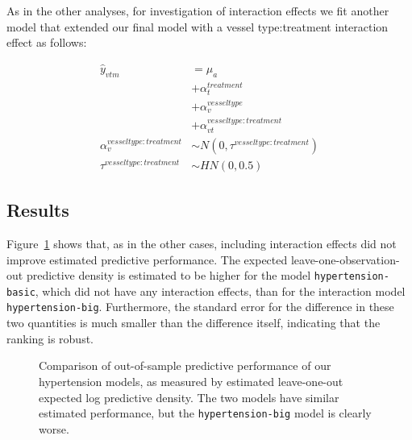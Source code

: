 \documentclass[
  letterpaper,
  DIV=11,
  numbers=noendperiod,
  oneside]{scrartcl}
\theoremstyle{plain}
\theoremstyle{remark}
\begin{document}
As in the other analyses, for investigation of interaction effects we
fit another model that extended our final model with a vessel
type:treatment interaction effect as follows:

\begin{align}
\hat{y}_{vtm} &= \mu_a \nonumber \\
  &+ \alpha^{treatment}_{t} \nonumber \\
  &+ \alpha^{vesseltype}_{v} \nonumber \\
  &+ \alpha^{vesseltype:treatment}_{vt} \nonumber \\
\alpha^{vesseltype:treatment}_v &\sim N(0, \tau^{vesseltype:treatment}) \nonumber \\
\tau^{vesseltype:treatment} &\sim HN(0, 0.5) \nonumber
\end{align}

\subsection{Results}\label{results-3}

Figure~\ref{fig-hypertension-loo} shows that, as in the other cases,
including interaction effects did not improve estimated predictive
performance. The expected leave-one-observation-out predictive density
is estimated to be higher for the model \texttt{hypertension-basic},
which did not have any interaction effects, than for the interaction
model \texttt{hypertension-big}. Furthermore, the standard error for the
difference in these two quantities is much smaller than the difference
itself, indicating that the ranking is robust.

\begin{figure}


\caption{\label{fig-hypertension-loo}Comparison of out-of-sample
predictive performance of our hypertension models, as measured by
estimated leave-one-out expected log predictive density. The two models
have similar estimated performance, but the \texttt{hypertension-big}
model is clearly worse.}

\end{figure}%
\end{document}
